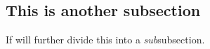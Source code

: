 \documentclass[../../../main.tex]{subfiles}
\begin{document}
\subsection{This is another subsection}
If will further divide this into a \textit{sub}subsection.

\end{document}
